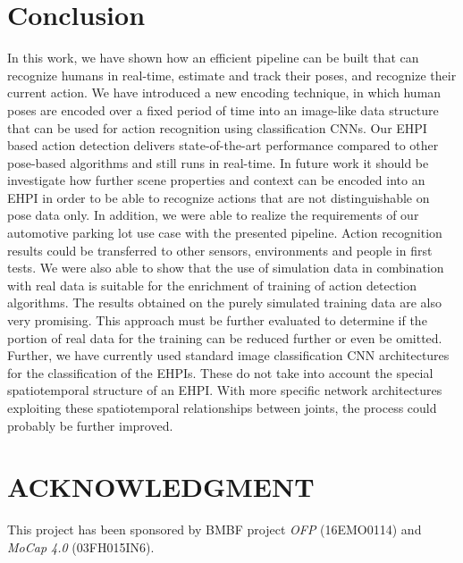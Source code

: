 \documentclass[a4paper, 10pt, conference]{ieeeconf}
\begin{document}
\section{Conclusion}
In this work, we have shown how an efficient pipeline can be built that can recognize humans in real-time, estimate and track their poses, and recognize their current action. We have introduced a new encoding technique, in which human poses are encoded over a fixed period of time into an image-like data structure that can be used for action recognition using classification CNNs. Our EHPI based action detection delivers state-of-the-art performance compared to other pose-based algorithms and still runs in real-time. In future work it should be investigate how further scene properties and context can be encoded into an EHPI in order to be able to recognize actions that are not distinguishable on pose data only. In addition, we were able to realize the requirements of our automotive parking lot use case with the presented pipeline. Action recognition results could be transferred to other sensors, environments and people in first tests. We were also able to show that the use of simulation data in combination with real data is suitable for the enrichment of training of action detection algorithms. The results obtained on the purely simulated training data are also very promising. This approach must be further evaluated to determine if the portion of real data for the training can be reduced further or even be omitted. Further, we have currently used standard image classification CNN architectures for the classification of the EHPIs. These do not take into account the special spatiotemporal structure of an EHPI. With more specific network architectures exploiting these spatiotemporal relationships between joints, the process could probably be further improved. 



\addtolength{\textheight}{-12cm}   



\section*{ACKNOWLEDGMENT}
This project has been sponsored by BMBF project \textit{OFP} (16EMO0114) and \textit{MoCap 4.0} (03FH015IN6). 






\end{document}
